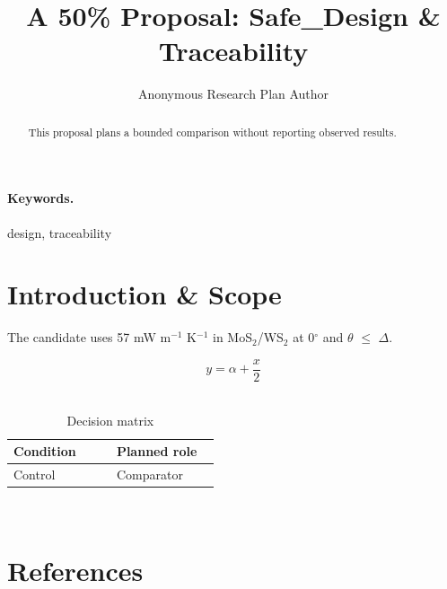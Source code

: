 \documentclass{article}
\title{A 50\% Proposal: Safe\_Design \& Traceability}
\author{Anonymous Research Plan Author}
\begin{document}
\maketitle
\begin{abstract}
This proposal plans a bounded comparison without reporting observed results.
\end{abstract}
\paragraph{Keywords.} design, traceability
\section{Introduction \& Scope}
The candidate uses 57 mW m$^{-1}$ K$^{-1}$ in MoS$_{2}$/WS$_{2}$ at 0$^\circ$ and $\theta$ $\leq$ $\Delta$.~\cite{cite_example_1}

\begin{equation}
y = \alpha + \frac{x}{2}
\label{eq:introduction-B2}
\end{equation}~\cite{cite_example_1}

\begin{table}[htbp]
\centering
\small


\caption{Decision matrix}
\label{tab:introduction-B3}
\begin{tabular}{|p{0.45\linewidth}|p{0.45\linewidth}|}
\hline
Condition & Planned role \\\hline
Control & Comparator \\\hline
\end{tabular}
\end{table}~\cite{cite_example_1}
\section*{References}


\end{document}

